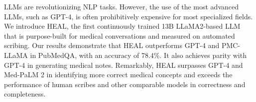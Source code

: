LLMs are revolutionizing NLP tasks. However, the use of the most advanced LLMs, such as GPT-4, is often prohibitively expensive for most specialized fields. We introduce HEAL, the first continuously trained 13B LLaMA2-based LLM that is purpose-built for medical conversations and measured on automated scribing. Our results demonstrate that HEAL outperforms GPT-4 and PMC-LLaMA in PubMedQA, with an accuracy of 78.4\%. It also achieves parity with GPT-4 in generating medical notes. Remarkably, HEAL surpasses GPT-4 and Med-PaLM 2 in identifying more correct medical concepts and exceeds the performance of human scribes and other comparable models in correctness and completeness.